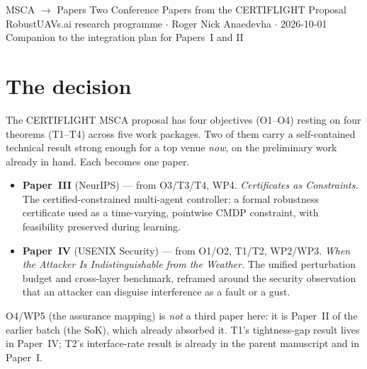 \documentclass[11pt,a4paper]{article}
\begin{document}
\proposalheader
  {MSCA $\to$ Papers}
  {Two Conference Papers from the CERTIFLIGHT Proposal}
  {RobustUAVs.ai research programme $\cdot$ Roger Nick Anaedevha $\cdot$
   2026-10-01\\
   Companion to the integration plan for Papers~I and II}

\section{The decision}
The CERTIFLIGHT MSCA proposal has four objectives (O1--O4) resting on four
theorems (T1--T4) across five work packages. Two of them carry a self-contained
technical result strong enough for a top venue \emph{now}, on the preliminary
work already in hand. Each becomes one paper.

\begin{itemize}
\item \textbf{Paper~III} (NeurIPS) --- from O3/T3/T4, WP4.
  \emph{Certificates as Constraints.} The certified-constrained multi-agent
  controller: a formal robustness certificate used as a time-varying, pointwise
  CMDP constraint, with feasibility preserved during learning.
\item \textbf{Paper~IV} (USENIX Security) --- from O1/O2, T1/T2, WP2/WP3.
  \emph{When the Attacker Is Indistinguishable from the Weather.} The unified
  perturbation budget and cross-layer benchmark, reframed around the security
  observation that an attacker can disguise interference as a fault or a gust.
\end{itemize}

\noindent
O4/WP5 (the assurance mapping) is \emph{not} a third paper here: it is
Paper~II of the earlier batch (the SoK), which already absorbed it. T1's
tightness-gap result lives in Paper~IV; T2's interface-rate result is already in
the parent manuscript and in Paper~I.

\end{document}
